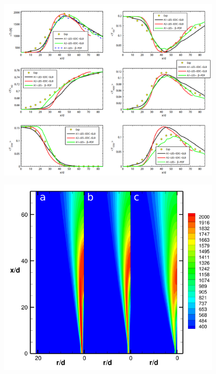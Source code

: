 \begin{figure}[H]
    \centering
    \includegraphics[width=0.95\linewidth]{figs/SandiaD/Screenshot from 2025-03-12 06-57-30.png}
    \label{fig:domain}
\end{figure}

\begin{figure}[H]
    \centering
    \includegraphics[width=0.95\linewidth]{figs/SandiaD/Screenshot from 2025-03-12 06-55-33.png}
    \label{fig:domain}
\end{figure}


